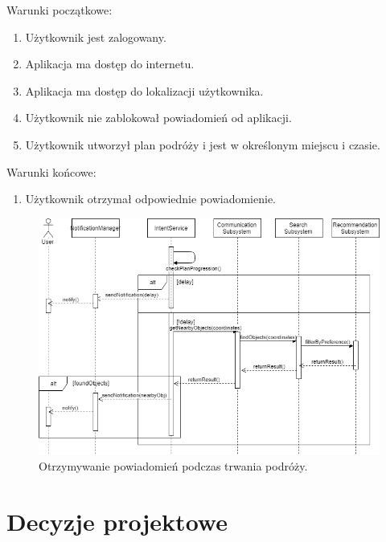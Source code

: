 \documentclass[10pt,twoside,a4paper]{report}
\begin{document}
\noindent\newline Warunki początkowe:
\begin{enumerate}
  \item Użytkownik jest zalogowany.
  \item Aplikacja ma dostęp do internetu.
  \item Aplikacja ma dostęp do lokalizacji użytkownika.
  \item Użytkownik nie zablokował powiadomień od aplikacji.
  \item Użytkownik utworzył plan podróży i jest w określonym miejscu i czasie.
\end{enumerate}
\par
\noindent\newline
Warunki końcowe:
\begin{enumerate}
  \item Użytkownik otrzymał odpowiednie powiadomienie.
\end{enumerate}

\noindent\newline
\begin{figure}[h]
\centering
\includegraphics[width=\linewidth]{whileTravelling}
\caption{Otrzymywanie powiadomień podczas trwania podróży.}
\label{fig:whileTravelling}
\end{figure}

\chapter{Decyzje projektowe}
\end{document}
